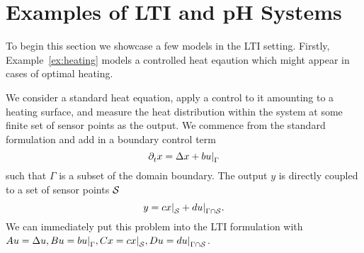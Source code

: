 \section{Examples of LTI and pH Systems}

To begin this section we showcase a few models in the LTI setting.
Firstly, Example~\ref{ex:heating} models a controlled heat eqaution which might appear in cases of optimal heating.

\begin{example}\label{ex:heating}
    We consider a standard heat equation, apply a control to it amounting to a heating surface, and measure the heat distribution within the system at some finite set of sensor points as the output.
    We commence from the standard formulation and add in a boundary control term
    \begin{equation*}
        \pd[t]{} x = \lapl{x} + b \res{u}{\Gamma}
    \end{equation*}
    such that $\Gamma$ is a subset of the domain boundary.
    The output $y$ is directly coupled to a set of sensor points $\mathcal{S}$
    \begin{equation*}
        y = c \res{x}{\mcl{S}} + d \res{u}{\Gamma \cap \mcl{S}}.
    \end{equation*}
    We can immediately put this problem into the LTI formulation with $A u = \lapl{u}, B u = b \res{u}{\Gamma}, C x = c \res{x}{\mcl{S}}, D u = d \res{u}{\Gamma \cap \mcl{S}}$.
\end{example}


